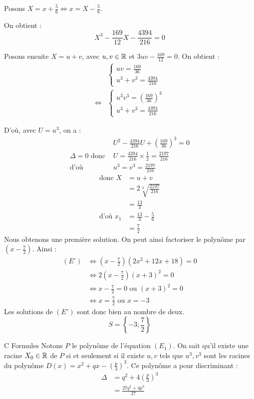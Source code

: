 \documentclass[]{../templates/homework}
\begin{document}
Posons $X = x + \frac{5}{6} \iff x = X - \frac{5}{6}$.

On obtient : $$X^3 - \frac{169}{12}X - \frac{4394}{216} = 0$$

Posons ensuite $X = u + v$, avec $u, v \in \mathbb R$ et $3uv - \frac{169}{12} = 0$. On obtient :
\begin{align*}
	&\begin{cases}
		uv = \frac{169}{36}\\
		u^3 + v^3 = \frac{4394}{216}
	\end{cases} \\
	\iff 
	&\begin{cases}
		u^3v^3 = (\frac{169}{36})^3\\
		u^3 + v^3 = \frac{4394}{216}
	\end{cases}
\end{align*}

D'où, avec $U = u^3$, on a :
\begin{align*}
	&U^2 - \frac{4394}{216}U + \left( \frac{169}{36} \right)^3 = 0 \\
	\Delta = 0 \text{ donc } &U = \frac{4394}{216} \times \frac{1}{2} = \frac{2197}{216} \\
	\text{d'où } &u^3 = v^3 = \frac{2197}{216}
\end{align*}
\begin{align*}
	\text{donc } X &= u + v \\
	&= 2\sqrt[3]{\frac{2197}{216}} \\
	&= \frac{13}{3} \\
	\text{d'où } x_1 &= \frac{13}{3} - \frac{5}{6} \\
	&= \frac{7}{2}
\end{align*}
Nous obtenons une première solution. On peut ainsi factoriser le polynôme par $(x - \frac{7}{2})$. Ainsi :
\begin{align*}
	(E') & \iff \left( x - \frac{7}{2} \right) (2x^2 + 12x + 18) = 0 \\
	& \iff 2 \left( x - \frac{7}{2} \right) (x+3)^2 = 0 \\
	& \iff x - \frac{7}{2} = 0 \text{ ou } (x+3)^2 = 0 \\
	& \iff x = \frac{7}{2} \text{ ou } x = -3
\end{align*}
Les solutions de $(E')$ sont donc bien au nombre de deux.
$$ S = \left\{ -3 ; \frac{7}{2} \right\} $$

\partie C {Formules}
\subproblem Notons $P$ le polynôme de l'équation $(E_1)$. On sait qu'il existe une racine $X_0 \in \mathbb R$ de $P$ si et seulement si il existe $u,v$ tels que $u^3,v^3$ sont les racines du polynôme $D(x) = x^2 + qx - \left(\frac p 3\right)^3$.
Ce polynôme a pour discriminant :
\begin{align*}
	\Delta &= q^2 + 4\left(\frac p 3\right)^3 \\
	&=  \frac {27q^2 + 4p^3}{27}
\end{align*}
\end{document}
